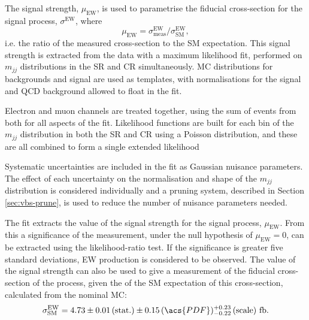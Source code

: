 
The signal strength, $\mu_\text{EW}$, is used to parametrise the fiducial
cross-section for the signal process, $\sigma^\text{EW}$, where
%
\begin{equation*}
  \mu_\text{EW} = \sigma^\text{EW}_\text{meas} / \sigma^\text{EW}_\text{SM},
\end{equation*}
%
i.e. the ratio of the measured cross-section to the \ac{SM} expectation. This
signal strength is extracted from the data with a maximum likelihood fit,
performed on $m_{jj}$ distributions in the \ac{SR} and \ac{CR} simultaneously.
\ac{MC} distributions for backgrounds and signal are used as templates, with
normalisations for the signal and \ac{QCD} \Zy background allowed to float in
the fit.

Electron and muon channels are treated together, using the sum of events from
both for all aspects of the fit.  Likelihood functions are built for each bin of
the $m_{jj}$ distribution in both the \ac{SR} and \ac{CR} using a Poisson
distribution, and these are all combined to form a single extended likelihood

Systematic uncertainties are included in the fit as Gaussian nuisance
parameters. The effect of each uncertainty on the normalisation and shape of the
$m_{jj}$ distribution is considered individually and a pruning system, described
in Section \ref{sec:vbs-prune}, is used to reduce the number of nuisance
parameters needed.

The fit extracts the value of the signal strength for the signal process,
$\mu_\text{EW}$. From this a significance of the measurement, under the null
hypothesis of $\mu_\text{EW}=0$, can be extracted using the likelihood-ratio
test. If the significance is greater five standard deviations, \ac{EW} \Zy
production is considered to be observed. The value of the signal strength can
also be used to give a measurement of the fiducial cross-section of the process,
given the of the \ac{SM} expectation of this cross-section, calculated from the
nominal \ac{MC}:
%
\begin{equation*}
  \sigma^\text{EW}_\text{SM} = 4.73
  \pm 0.01 \, (\text{stat.})
  \pm 0.15 \, (\acs{PDF})
  ^{+0.23} _{-0.22} \, (\text{scale})
  ~\text{fb}.
\end{equation*}

